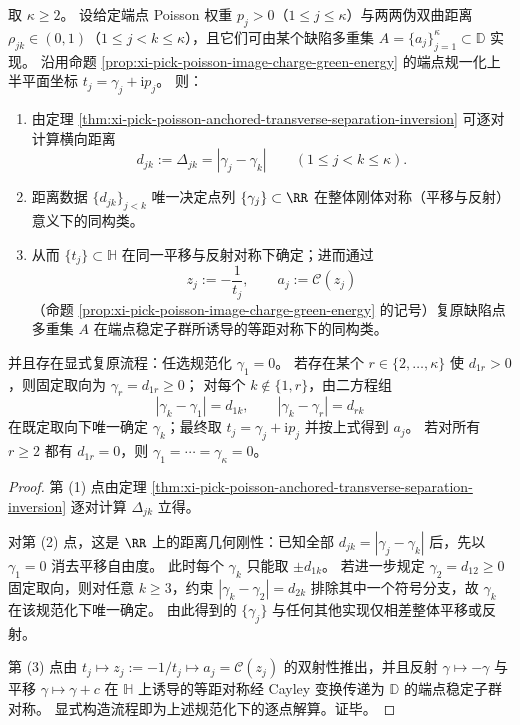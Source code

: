 \begin{theorem}\label{thm:xi-pick-poisson-anchored-gram-rigidity-reconstruction}
取 \(\kappa\ge 2\)。
设给定端点 Poisson 权重 \(p_j>0\)（\(1\le j\le\kappa\)）与两两伪双曲距离 \(\rho_{jk}\in(0,1)\)（\(1\le j<k\le\kappa\)），且它们可由某个缺陷多重集 \(A=\{a_j\}_{j=1}^{\kappa}\subset\mathbb D\) 实现。
沿用命题 \ref{prop:xi-pick-poisson-image-charge-green-energy} 的端点规一化上半平面坐标 \(t_j=\gamma_j+\mathrm{i}p_j\)。
则：
\begin{enumerate}
  \item 由定理 \ref{thm:xi-pick-poisson-anchored-transverse-separation-inversion} 可逐对计算横向距离
  \[
  d_{jk}:=\Delta_{jk}=|\gamma_j-\gamma_k|\qquad(1\le j<k\le\kappa).
  \]
  \item 距离数据 \(\{d_{jk}\}_{j<k}\) 唯一决定点列 \(\{\gamma_j\}\subset\RR\) 在整体刚体对称（平移与反射）意义下的同构类。
  \item 从而 \(\{t_j\}\subset\mathbb H\) 在同一平移与反射对称下确定；进而通过
  \[
  z_j:=-\frac{1}{t_j},\qquad a_j:=\mathcal C(z_j)
  \]
  （命题 \ref{prop:xi-pick-poisson-image-charge-green-energy} 的记号）复原缺陷点多重集 \(A\) 在端点稳定子群所诱导的等距对称下的同构类。
\end{enumerate}
并且存在显式复原流程：任选规范化 \(\gamma_1=0\)。
若存在某个 \(r\in\{2,\dots,\kappa\}\) 使 \(d_{1r}>0\)，则固定取向为 \(\gamma_r=d_{1r}\ge 0\)；
对每个 \(k\notin\{1,r\}\)，由二方程组
\[
|\gamma_k-\gamma_1|=d_{1k},\qquad |\gamma_k-\gamma_r|=d_{rk}
\]
在既定取向下唯一确定 \(\gamma_k\)；最终取 \(t_j=\gamma_j+\mathrm{i}p_j\) 并按上式得到 \(a_j\)。
若对所有 \(r\ge 2\) 都有 \(d_{1r}=0\)，则 \(\gamma_1=\cdots=\gamma_\kappa=0\)。
\end{theorem}
\begin{proof}
第 (1) 点由定理 \ref{thm:xi-pick-poisson-anchored-transverse-separation-inversion} 逐对计算 \(\Delta_{jk}\) 立得。
\par
对第 (2) 点，这是 \(\RR\) 上的距离几何刚性：已知全部 \(d_{jk}=|\gamma_j-\gamma_k|\) 后，先以 \(\gamma_1=0\) 消去平移自由度。
此时每个 \(\gamma_k\) 只能取 \(\pm d_{1k}\)。
若进一步规定 \(\gamma_2=d_{12}\ge 0\) 固定取向，则对任意 \(k\ge 3\)，约束 \(|\gamma_k-\gamma_2|=d_{2k}\) 排除其中一个符号分支，故 \(\gamma_k\) 在该规范化下唯一确定。
由此得到的 \(\{\gamma_j\}\) 与任何其他实现仅相差整体平移或反射。
\par
第 (3) 点由 \(t_j\mapsto z_j:=-1/t_j\mapsto a_j=\mathcal C(z_j)\) 的双射性推出，并且反射 \(\gamma\mapsto-\gamma\) 与平移 \(\gamma\mapsto\gamma+c\) 在 \(\mathbb H\) 上诱导的等距对称经 Cayley 变换传递为 \(\mathbb D\) 的端点稳定子群对称。
显式构造流程即为上述规范化下的逐点解算。证毕。
\end{proof}

